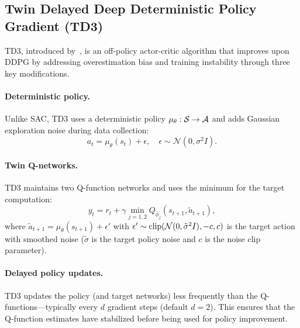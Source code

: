 \subsection{Twin Delayed Deep Deterministic Policy Gradient (TD3)}
\label{sec:td3}

TD3, introduced by~\citet{fujimoto2018td3}, is an off-policy actor-critic algorithm that improves upon DDPG by addressing overestimation bias and training instability through three key modifications.

\paragraph{Deterministic policy.} Unlike SAC, TD3 uses a deterministic policy $\mu_\theta: \mathcal{S} \to \mathcal{A}$ and adds Gaussian exploration noise during data collection:
\begin{equation}
    a_t = \mu_\theta(s_t) + \epsilon, \quad \epsilon \sim \mathcal{N}(0, \sigma^2 I).
    \label{eq:td3_explore}
\end{equation}

\paragraph{Twin Q-networks.} TD3 maintains two Q-function networks and uses the minimum for the target computation:
\begin{equation}
    y_t = r_t + \gamma \min_{j=1,2} Q_{\bar{\phi}_j}(s_{t+1}, \tilde{a}_{t+1}),
    \label{eq:td3_target}
\end{equation}
where $\tilde{a}_{t+1} = \mu_{\bar{\theta}}(s_{t+1}) + \epsilon'$ with $\epsilon' \sim \operatorname{clip}(\mathcal{N}(0, \tilde{\sigma}^2 I), -c, c)$ is the target action with smoothed noise ($\tilde{\sigma}$ is the target policy noise and $c$ is the noise clip parameter).

\paragraph{Delayed policy updates.} TD3 updates the policy (and target networks) less frequently than the Q-functions---typically every $d$ gradient steps (default $d = 2$). This ensures that the Q-function estimates have stabilized before being used for policy improvement.

